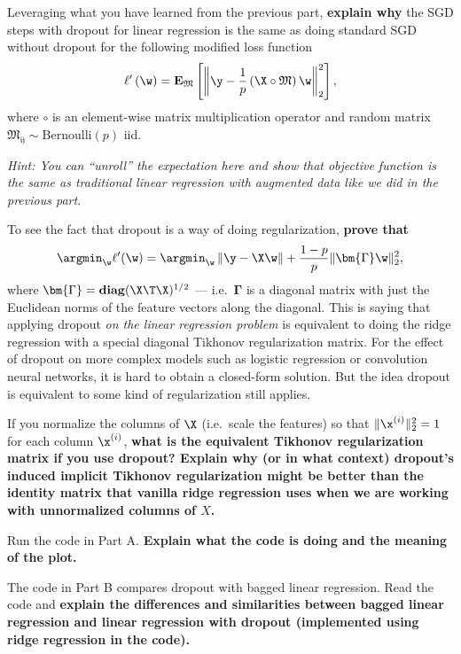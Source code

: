 \documentclass[preview]{standalone}
\begin{document}
\begin{Parts}
\Part 
Leveraging what you have learned from the previous part,
\textbf{explain why} the SGD steps with dropout for linear regression
is the same as doing standard SGD without dropout for the following
modified loss function
\begin{equation}
    \ell'\left(\w\right) = \mathbf{E}_{\mathfrak{M}} \left[\left\lVert \y-\frac{1}{p} \left(\X \circ \mathfrak{M}\right)\w \right\rVert_2^2 \right], \label{eq:dropout}
\end{equation}
where $\circ$ is an element-wise matrix multiplication operator and
random matrix $\mathfrak{M_{ij}} \sim \mathrm{Bernoulli}(p)$ iid. 

{\em Hint: You can ``unroll'' the expectation here and show that objective
  function is the same as traditional linear regression with augmented
  data like we did in the previous part.}




\Part To see the fact that dropout is a way of doing regularization, \textbf{prove that}
\begin{equation}
    \argmin_{\w} \ell'(\w) = \argmin_{\w} \left\lVert \y-\X\w \right\rVert + \frac{1-p}{p}\lVert\bm{\Gamma}\w\rVert_2^2,
\end{equation}
where $\bm{\Gamma}=\mathbf{diag}(\X\T \X)^{1/2}$ --- i.e.~$\bm{\Gamma}$
is a diagonal matrix with just the Euclidean norms of the feature
vectors along the diagonal.  This is saying that applying dropout
\emph{on the linear regression problem} is equivalent to doing the
ridge regression with a special diagonal Tikhonov regularization
matrix.  For the effect of dropout on more complex models such as
logistic regression or convolution neural networks, it is hard to
obtain a closed-form solution.  But the idea dropout is equivalent to some kind of regularization still applies.




\Part  If you normalize the columns of $\X$ (i.e.~scale the features)
so that $\lVert \x^{(i)} \rVert_2^2=1$ for each column $\x^{(i)}$,
\textbf{what is the equivalent Tikhonov regularization matrix if you
  use dropout?  Explain why (or in what context) dropout's induced implicit Tikhonov
  regularization might be better than the identity matrix that vanilla
  ridge regression uses when we are working with unnormalized columns of $X$.} 



\Part Run the code in Part A.  \textbf{Explain what the code is doing and the meaning of the plot.}



\Part  The code in Part B compares dropout with bagged linear
regression.  Read the code and \textbf{explain the differences and
  similarities between bagged linear regression and linear regression
  with dropout (implemented using ridge regression in the code).}



\end{Parts}
\end{document}
